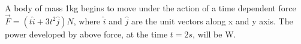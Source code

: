 \item A body of mass 1kg begins to move under the action of a time dependent force  $\vec{F} = \left( t\hat{i} +3t^{2}\hat{j} \right) N$, where $\hat{i}$ and $\hat{j}$ are the unit vectors along x and y axis. The power developed by above force, at the time $t = 2s$, will be \underline{\hspace{2.5cm}} W.